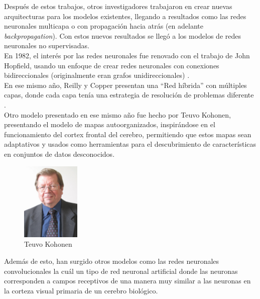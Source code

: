 Después de estos trabajos, otros investigadores trabajaron en crear
nuevas arquitecturas para los modelos existentes, llegando a
resultados como las redes neuronales multicapa o con propagación hacia
atrás (en adelante \textit{backpropagation}). Con estos nuevos
resultados se llegó a los modelos de redes neuronales no
supervisadas.\\

En 1982, el interés por las redes neuronales fue renovado con el
trabajo de John Hopfield, usando un enfoque de crear redes neuronales
con conexiones bidireccionales (originalmente eran grafos
unidireccionales) \cite{hopfield1982neural}.\\

En ese mismo año, Reilly y Copper presentan una ``Red híbrida'' con
múltiples capas, donde cada capa tenía una estrategia de resolución de
problemas diferente \cite{reilly1982neural}.\\

Otro modelo presentado en ese mismo año fue hecho por Teuvo Kohonen,
presentando el modelo de mapas autoorganizados, inspirándose en el
funcionamiento del cortex frontal del cerebro, permitiendo que estos
mapas sean adaptativos y usados como herramientas para el
descubrimiento de características en conjuntos de datos
desconocidos\cite{kohonen1982som, Kohonen2001}.\\

\begin{figure}
    \centering
    \includegraphics[width=0.25\textwidth]{teuvo}
    \caption{Teuvo Kohonen}
    \label{fig:turing}
\end{figure}


Además de esto, han surgido otros modelos como las redes neuronales
convolucionales \cite{hubel1968receptive, fukushima1980neocognitron,
  behnke2003hierarchical, lecun1998gradient, graupe1988applications}
la cuál un tipo de red neuronal artificial donde las neuronas
corresponden a campos receptivos de una manera muy similar a las
neuronas en la corteza visual primaria de un cerebro biológico.\\


